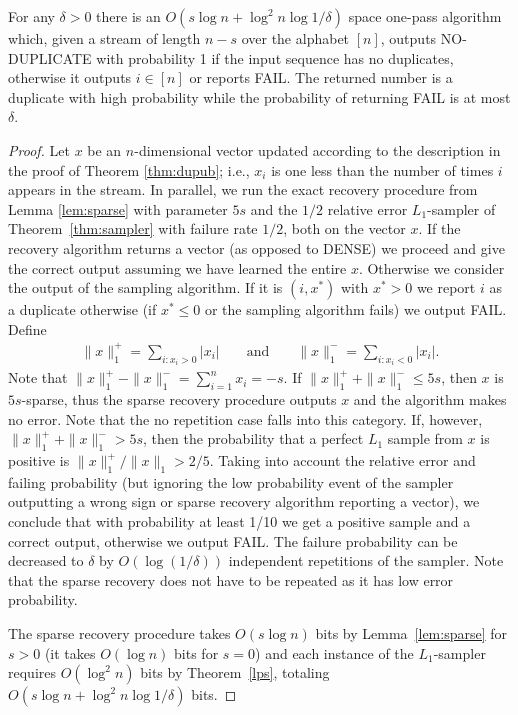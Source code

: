 \begin{theorem}\label{dups}
For any $\delta>0$ there is an $O(s\log n+\log^2 n\log
  1/\delta)$ space one-pass algorithm which, given a stream of length $n-s$
  over the alphabet $[n]$, outputs NO-DUPLICATE with probability 
  1 if the input sequence has no duplicates, otherwise 
  it outputs $i \in [n]$ or reports FAIL. The returned number is a
  duplicate with high probability while the probability of returning FAIL is at most $\delta$.
\end{theorem}
\begin{proof} Let $x$ be an $n$-dimensional vector updated
  according to the description in the proof of Theorem \ref{thm:dupub}; i.e.,
  $x_i$ is one less than the number of times $i$ appears in the stream. In parallel,
   we run the exact recovery procedure from Lemma \ref{lem:sparse} with parameter $5s$
  and the $1/2$ relative error $L_1$-sampler of 
  Theorem~\ref{thm:sampler} with failure rate $1/2$, both on the vector $x$. If the
  recovery algorithm returns a vector (as opposed to DENSE) we proceed 
  and give the correct output
  assuming we have learned the entire $x$. Otherwise we consider the output of the sampling
  algorithm. If it is $(i,x^*)$ with $x^*>0$ we report $i$ as a duplicate
  otherwise (if $x^*\le0$ or the sampling algorithm fails) we output FAIL.
Define
\begin{align*}
\|x\|^+_1=\sum_{i:x_i>0} |x_i| & &\text{ and }& &\|x\|_1^-=\sum_{i:x_i<0} |x_i|.
\end{align*}
Note that $\|x\|^+_1-\|x\|_1^-=\sum_{i=1}^n x_i = -s$.
 If $\|x\|^+_1 + \|x\|^-_1 \leq 5s$, then $x$ is $5s$-sparse, thus the sparse
recovery procedure outputs $x$ and the algorithm makes no error. Note that the
no repetition case falls into this category. If, however,
$\|x\|^+_1 + \|x\|^-_1 > 5s$, then the probability that a perfect $L_1$ sample
from $x$ is positive is $\|x\|^+_1/\|x\|_1 > 2/5$. Taking into account the
relative error and failing probability (but ignoring the low probability event
of the sampler outputting a wrong sign or sparse recovery algorithm reporting
a vector), we conclude that with probability at
least 1/10 we get a positive sample and a correct output, otherwise we output
FAIL. The failure probability can be decreased to $\delta$ by
$O(\log(1/\delta))$ independent repetitions of the sampler. Note that the
sparse recovery does not have to be repeated as it has low error probability.

The sparse recovery procedure takes $O(s\log n)$ bits by
Lemma~\ref{lem:sparse} for $s>0$ (it takes $O(\log n)$ bits for $s=0$) and
each instance of the $L_1$-sampler requires $O(\log^2 n)$ bits by
Theorem~\ref{lps}, totaling $O(s\log n + \log^2n\log1/\delta)$ bits. 
\end{proof}

